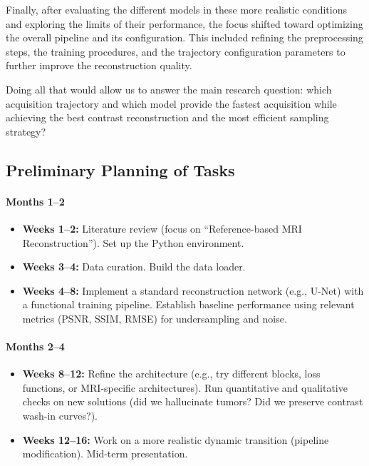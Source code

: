\documentclass[12pt]{article}
\begin{document}
Finally, after evaluating the different models in these more realistic conditions and exploring the limits of their performance, the focus shifted toward optimizing the overall pipeline and its configuration.
This included refining the preprocessing steps, the training procedures, and the trajectory configuration parameters to further improve the reconstruction quality.
\vspace{0.5cm}

Doing all that would allow us to answer the main research question: which acquisition trajectory and which model provide the fastest acquisition while achieving the best contrast reconstruction and the most efficient sampling strategy?

\subsection{Preliminary Planning of Tasks}

\paragraph{Months 1--2}

\begin{itemize}
    \item \textbf{Weeks 1--2:} Literature review (focus on ``Reference-based MRI Reconstruction''). Set up the Python environment.
    \item \textbf{Weeks 3--4:} Data curation. Build the data loader.
    \item \textbf{Weeks 4--8:} Implement a standard reconstruction network (e.g., U-Net) with a functional training pipeline.
    Establish baseline performance using relevant metrics (PSNR, SSIM, RMSE) for undersampling and noise.
\end{itemize}

\paragraph{Months 2--4}

\begin{itemize}
    \item \textbf{Weeks 8--12:} Refine the architecture (e.g., try different blocks, loss functions, or MRI-specific architectures).
    Run quantitative and qualitative checks on new solutions (did we hallucinate tumors? Did we preserve contrast wash-in curves?).
    \item \textbf{Weeks 12--16:} Work on a more realistic dynamic transition (pipeline modification).
    Mid-term presentation.
\end{itemize}
\end{document}
